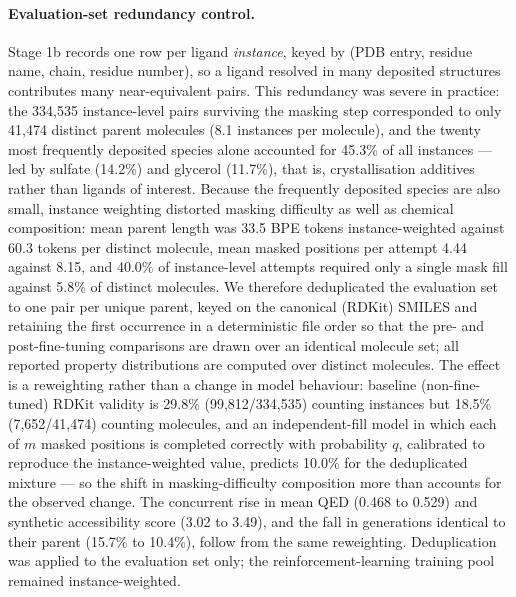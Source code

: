 \paragraph{Evaluation-set redundancy control.}
Stage 1b records one row per ligand \emph{instance}, keyed by (PDB entry,
residue name, chain, residue number), so a ligand resolved in many deposited
structures contributes many near-equivalent pairs. This redundancy was severe
in practice: the 334{,}535 instance-level pairs surviving the masking step
corresponded to only 41{,}474 distinct parent molecules (8.1 instances per
molecule), and the twenty most frequently deposited species alone accounted for
45.3\% of all instances --- led by sulfate (14.2\%) and glycerol (11.7\%), that
is, crystallisation additives rather than ligands of interest. Because the
frequently deposited species are also small, instance weighting distorted
masking difficulty as well as chemical composition: mean parent length was 33.5
BPE tokens instance-weighted against 60.3 tokens per distinct molecule, mean
masked positions per attempt 4.44 against 8.15, and 40.0\% of instance-level
attempts required only a single mask fill against 5.8\% of distinct molecules.
We therefore deduplicated the evaluation set to one pair per unique parent,
keyed on the canonical (RDKit) SMILES and retaining the first occurrence in a
deterministic file order so that the pre- and post-fine-tuning comparisons are
drawn over an identical molecule set; all reported property distributions are
computed over distinct molecules. The effect is a reweighting rather than a
change in model behaviour: baseline (non-fine-tuned) RDKit validity is 29.8\%
(99{,}812/334{,}535) counting instances but 18.5\% (7{,}652/41{,}474) counting
molecules, and an independent-fill model in which each of $m$ masked positions
is completed correctly with probability $q$, calibrated to reproduce the
instance-weighted value, predicts 10.0\% for the deduplicated mixture --- so
the shift in masking-difficulty composition more than accounts for the observed
change. The concurrent rise in mean QED (0.468 to 0.529) and synthetic
accessibility score (3.02 to 3.49), and the fall in generations identical to
their parent (15.7\% to 10.4\%), follow from the same reweighting.
Deduplication was applied to the evaluation set only; the reinforcement-learning
training pool remained instance-weighted.

